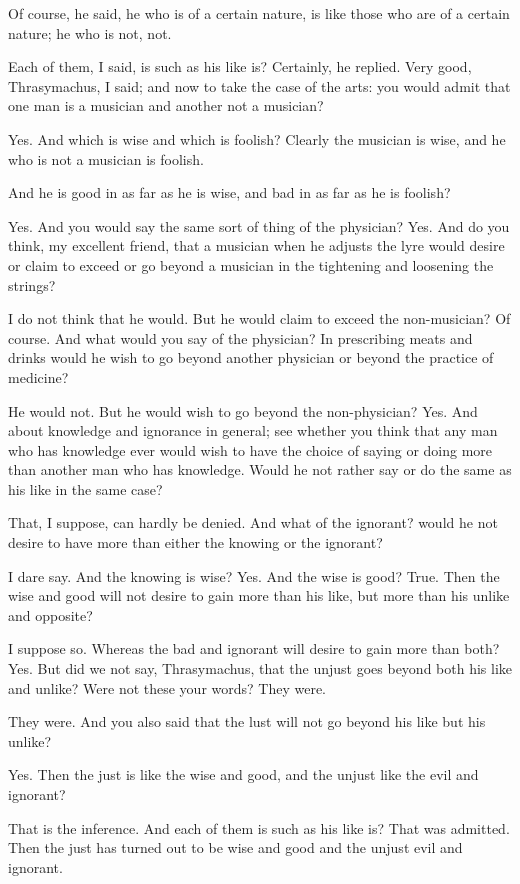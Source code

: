 Of course, he said, he who is of a certain nature, is like those who are of a certain nature; he who is not, not.

Each of them, I said, is such as his like is?
Certainly, he replied.
Very good, Thrasymachus, I said; and now to take the case of the arts: you would admit that one man is a musician and another not a musician?

Yes.
And which is wise and which is foolish?
Clearly the musician is wise, and he who is not a musician is foolish.

And he is good in as far as he is wise, and bad in as far as he is foolish?

Yes.
And you would say the same sort of thing of the physician?
Yes.
And do you think, my excellent friend, that a musician when he adjusts the lyre would desire or claim to exceed or go beyond a musician in the tightening and loosening the strings?

I do not think that he would.
But he would claim to exceed the non-musician?
Of course.
And what would you say of the physician? In prescribing meats and drinks would he wish to go beyond another physician or beyond the practice of medicine?

He would not.
But he would wish to go beyond the non-physician?
Yes.
And about knowledge and ignorance in general; see whether you think that any man who has knowledge ever would wish to have the choice of saying or doing more than another man who has knowledge. Would he not rather say or do the same as his like in the same case?

That, I suppose, can hardly be denied.
And what of the ignorant? would he not desire to have more than either the knowing or the ignorant?

I dare say.
And the knowing is wise?
Yes.
And the wise is good?
True.
Then the wise and good will not desire to gain more than his like, but more than his unlike and opposite?

I suppose so.
Whereas the bad and ignorant will desire to gain more than both?
Yes.
But did we not say, Thrasymachus, that the unjust goes beyond both his like and unlike? Were not these your words? They were.

They were.
And you also said that the lust will not go beyond his like but his unlike?

Yes.
Then the just is like the wise and good, and the unjust like the evil and ignorant?

That is the inference.
And each of them is such as his like is?
That was admitted.
Then the just has turned out to be wise and good and the unjust evil and ignorant.

